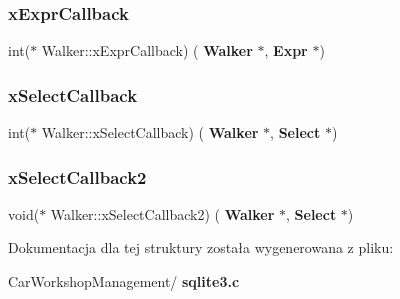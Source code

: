 \mbox{\label{struct_walker_a46cbdf0ccdcf736096a2f168218d28fe}} 
\subsubsection{xExprCallback}
{\footnotesize\ttfamily int($\ast$ Walker\+::x\+Expr\+Callback) (\textbf{ Walker} $\ast$, \textbf{ Expr} $\ast$)}

\mbox{\label{struct_walker_a76a2f8850bf1db17955fe85d65831cb0}} 
\subsubsection{xSelectCallback}
{\footnotesize\ttfamily int($\ast$ Walker\+::x\+Select\+Callback) (\textbf{ Walker} $\ast$, \textbf{ Select} $\ast$)}

\mbox{\label{struct_walker_ad35c57031847321ab3db9b7c0946b5e7}} 
\subsubsection{xSelectCallback2}
{\footnotesize\ttfamily void($\ast$ Walker\+::x\+Select\+Callback2) (\textbf{ Walker} $\ast$, \textbf{ Select} $\ast$)}



Dokumentacja dla tej struktury została wygenerowana z pliku\+:\begin{DoxyCompactItemize}
\item 
Car\+Workshop\+Management/\textbf{ sqlite3.\+c}\end{DoxyCompactItemize}
